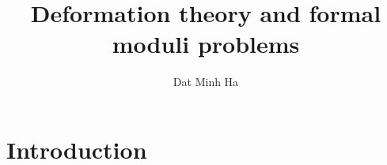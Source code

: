 

\setcounter{section}{-1}





    \title{Deformation theory and formal moduli problems}
    
    \author{Dat Minh Ha}
    \maketitle
    
    \begin{abstract}
        
    \end{abstract}
    
    {
      \hypersetup{} 
      \tableofcontents %
    }

    \section{Introduction}
    
    
    
    \printbibliography

